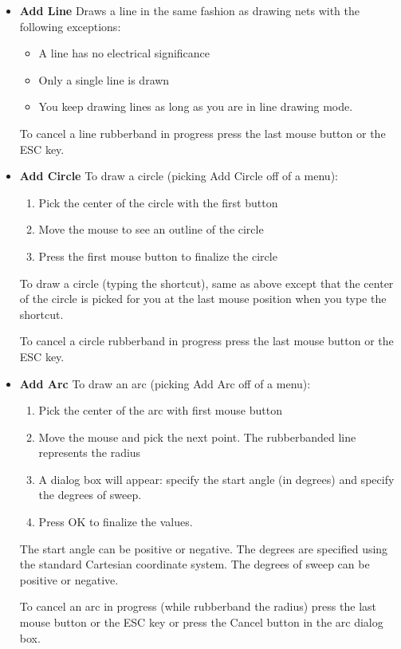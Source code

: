 \documentclass{article}
\begin{document}
\begin{itemize}
\item {\bf Add Line} Draws a line in the same fashion as drawing nets
  with the following exceptions:
\begin{itemize}
\item A line has no electrical significance
\item Only a single line is drawn
\item You keep drawing lines as long as you are in line drawing mode.
\end{itemize}
To cancel a line rubberband in progress press the last mouse button or
the ESC key.
        
\item {\bf Add Circle} To draw a circle (picking Add Circle off of a
  menu):
\begin{enumerate}
\item Pick the center of the circle with the first button
\item Move the mouse to see an outline of the circle
\item Press the first mouse button to finalize the circle
\end{enumerate}

To draw a circle (typing the shortcut), same as above except that the
center of the circle is picked for you at the last mouse position when
you type the shortcut.

To cancel a circle rubberband in progress press the last mouse button
or the ESC key.

\item {\bf Add Arc} To draw an arc (picking Add Arc off of a menu):
\begin{enumerate}
\item Pick the center of the arc with first mouse button
\item Move the mouse and pick the next point.  The rubberbanded line
  represents the radius
\item A dialog box will appear: specify the start angle (in degrees)
  and specify the degrees of sweep.
\item Press OK to finalize the values.
\end{enumerate}
The start angle can be positive or negative.  The degrees are
specified using the standard Cartesian coordinate system.  The degrees
of sweep can be positive or negative.

To cancel an arc in progress (while rubberband the radius) press the
last mouse button or the ESC key or press the Cancel button in the arc
dialog box.


\end{itemize}
\end{document}
